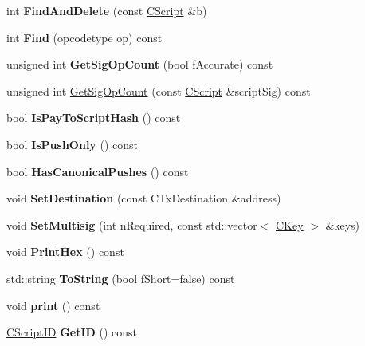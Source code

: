 \begin{DoxyCompactItemize}
\item 
\mbox{\label{class_c_script_aad6e9f84fe8aa2d27a979f1bc2732463}} 
int {\bfseries Find\+And\+Delete} (const \mbox{\hyperlink{class_c_script}{C\+Script}} \&b)
\item 
\mbox{\label{class_c_script_a89876c711ef226abd65088672cef6c2d}} 
int {\bfseries Find} (opcodetype op) const
\item 
\mbox{\label{class_c_script_a957f92ddf3efcd76b66e514c05f27dde}} 
unsigned int {\bfseries Get\+Sig\+Op\+Count} (bool f\+Accurate) const
\item 
unsigned int \mbox{\hyperlink{class_c_script_ab2fc38465955bb6688d204036633ee85}{Get\+Sig\+Op\+Count}} (const \mbox{\hyperlink{class_c_script}{C\+Script}} \&script\+Sig) const
\item 
\mbox{\label{class_c_script_a0c3729c606d318923dc06f95d85a0971}} 
bool {\bfseries Is\+Pay\+To\+Script\+Hash} () const
\item 
\mbox{\label{class_c_script_a804771eeafb1039672515eabbc823274}} 
bool {\bfseries Is\+Push\+Only} () const
\item 
\mbox{\label{class_c_script_ade3c28813e7c242c73a5d59731d589c5}} 
bool {\bfseries Has\+Canonical\+Pushes} () const
\item 
\mbox{\label{class_c_script_ad1b5a9077241aa06116040c4f1b7c31e}} 
void {\bfseries Set\+Destination} (const C\+Tx\+Destination \&address)
\item 
\mbox{\label{class_c_script_a44c703f98fa0fe7157e06fa481e42b7d}} 
void {\bfseries Set\+Multisig} (int n\+Required, const std\+::vector$<$ \mbox{\hyperlink{class_c_key}{C\+Key}} $>$ \&keys)
\item 
\mbox{\label{class_c_script_a04ec6d3347ff68d8e71432b2afa3e1da}} 
void {\bfseries Print\+Hex} () const
\item 
\mbox{\label{class_c_script_a75ea7216fa3b083fe7efffe72704c3b7}} 
std\+::string {\bfseries To\+String} (bool f\+Short=false) const
\item 
\mbox{\label{class_c_script_aeec8328beeb1d43b5c87773a3dee6f83}} 
void {\bfseries print} () const
\item 
\mbox{\label{class_c_script_a650fd970d7f03946c741ded7dba2c72c}} 
\mbox{\hyperlink{class_c_script_i_d}{C\+Script\+ID}} {\bfseries Get\+ID} () const
\end{DoxyCompactItemize}
